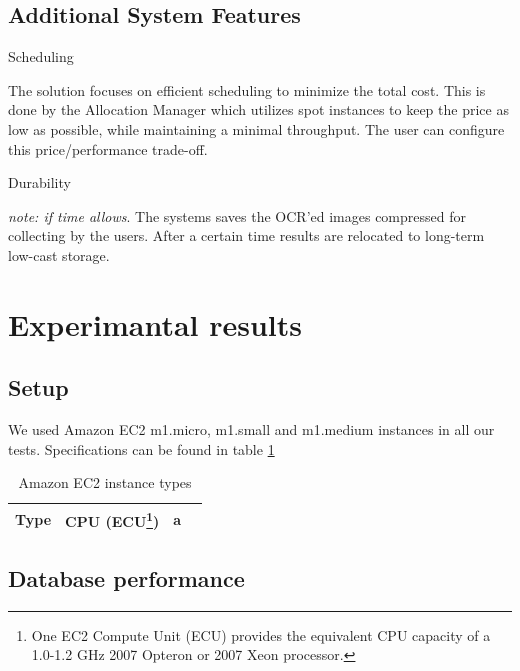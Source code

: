 \documentclass[a4paper]{IEEEtran}
\begin{document}
\subsection*{Additional System Features}

\begin{LaTeXdescription}

\item[Scheduling]

The solution focuses on efficient scheduling to minimize the total cost. This is done by the Allocation Manager which utilizes spot instances to keep the price as low as possible, while maintaining a minimal throughput. The user can configure this price/performance trade-off.

\item[Durability]

\emph{note: if time allows}. The systems saves the OCR'ed images compressed for collecting by the users. After a certain time results are relocated to long-term low-cast storage.

\end{LaTeXdescription}

\section{Experimantal results}

\subsection{Setup}

We used Amazon EC2 m1.micro, m1.small and m1.medium instances in all our tests. Specifications can be found in table \ref{amazoninstancespec}

\begin{table}
\centering
\begin{tabular}{| l | l | l | l |}
Type & CPU (ECU\footnote{One EC2 Compute Unit (ECU) provides the equivalent CPU capacity of a 1.0-1.2 GHz 2007 Opteron or 2007 Xeon processor.}) & a\\ \hline
\end{tabular}
\caption{Amazon EC2 instance types}
\label{amazoninstancespec}
\end{table}

\subsection{Database performance}
\end{document}
